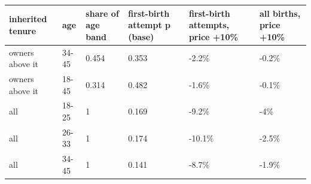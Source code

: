 \begingroup\small
\setlength{\tabcolsep}{3pt}
\renewcommand{\arraystretch}{1.04}
\begin{tabularx}{\linewidth}{XXXXXX}
\toprule
inherited tenure & age & share of age band & first-birth attempt p (base) & first-birth attempts, price +10\% & all births, price +10\% \\
\midrule
owners above it & 34-45 & 0.454 & 0.353 & -2.2\% & -0.2\% \\
owners above it & 18-45 & 0.314 & 0.482 & -1.6\% & -0.1\% \\
all & 18-25 & 1 & 0.169 & -9.2\% & -4\% \\
all & 26-33 & 1 & 0.174 & -10.1\% & -2.5\% \\
all & 34-45 & 1 & 0.141 & -8.7\% & -1.9\% \\
\bottomrule
\end{tabularx}
\endgroup
